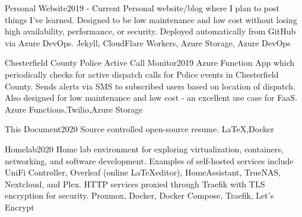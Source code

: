 \begin{projects}
    \project
    {Personal Website}{2019 - Current}
    {}
    {Personal website/blog where I plan to post things I've learned. Designed to be low maintenance and low cost without losing high availability, performance, or security. Deployed automatically from GitHub via Azure DevOps.}
    {Jekyll, CloudFlare Workers, Azure Storage, Azure DevOps}

    \project
    {Chesterfield County Police Active Call Monitor}{2019}
    {}
    {Azure Function App which periodically checks for active dispatch calls for Police events in Chesterfield County. Sends alerts via SMS to subscribed users based on location of dispatch. Also designed for low maintenance and low cost - an excellent use case for FaaS.}
    {Azure Functions,Twilio,Azure Storage}

    \project
    {This Document}{2020}
    {}
    {Source controlled open-source resume.}%
    {\LaTeX,Docker}

    \project
    {Homelab}{2020}
    {}
    {Home lab environment for exploring virtualization, containers, networking, and software development. Examples of self-hosted services include UniFi Controller, Overleaf (online \LaTeX editor), HomeAssistant, TrueNAS, Nextcloud, and Plex. HTTP services proxied through Traefik with TLS encryption for security.}
    {Proxmox, Docker, Docker Compose, Traefik, Let's Encrypt}
\end{projects}